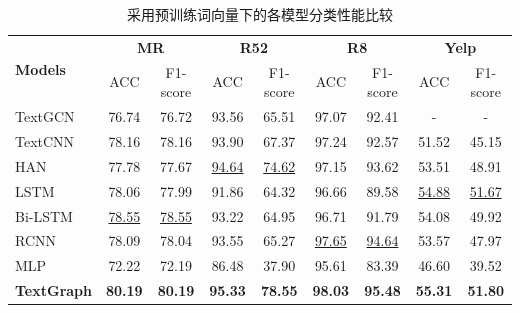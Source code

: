 \begin{table}[htb]
    \centering
    \caption{ 采用预训练词向量下的各模型分类性能比较}
    \renewcommand\arraystretch{1}
    \renewcommand\tabcolsep{0.7mm}
    \label{tab:acc-result}
    \begin{tabular}{lcccccccc}
    \hline
    \multirow{2}{*}{\textbf{Models}} & \multicolumn{2}{c}{\textbf{MR}} & \multicolumn{2}{c}{\textbf{R52}} & \multicolumn{2}{c}{\textbf{R8}} & \multicolumn{2}{c}{\textbf{Yelp}}  \\
    \cline{2-9}
                            & ACC   & F1-score       & ACC   & F1-score        & ACC   & F1-score       & ACC   & F1-score          \\
    \hline
    TextGCN                 & 76.74 & 76.72         & 93.56 & 65.51          & 97.07 & 92.41         & -     & -                 \\
    TextCNN                 & 78.16 & 78.16         & 93.90  & 67.37          & 97.24 & 92.57         & 51.52 & 45.15            \\
    HAN                     & 77.78 & 77.67         & \underline{94.64} & \underline{74.62}          & 97.15 & 93.62         & 53.51 & 48.91            \\
    LSTM                    & 78.06 & 77.99         & 91.86 & 64.32          & 96.66 & 89.58         & \underline{54.88} & \underline{51.67}            \\
    Bi-LSTM                 & \underline{78.55} & \underline{78.55}         & 93.22 & 64.95          & 96.71 & 91.79         & 54.08 & 49.92            \\
    RCNN                   & 78.09 & 78.04         & 93.55 & 65.27          & \underline{97.65} & \underline{94.64}          & 53.57 & 47.97            \\
    MLP                     & 72.22 & 72.19         & 86.48 & 37.90           & 95.61 & 83.39         & 46.60  & 39.52            \\
    \hline
    \textbf{TextGraph}                   & \textbf{80.19} & \textbf{80.19}         & \textbf{95.33} & \textbf{78.55}          & \textbf{98.03} & \textbf{95.48}         & \textbf{55.31} & \textbf{51.80}            \\
    \hline
    \end{tabular}
    \end{table}

